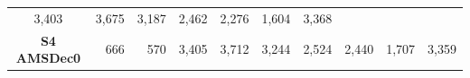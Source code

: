 \documentclass[]{article}
\begin{document}
\begin{longtable}[]{@{}crrrrrrrrr@{}}
\begin{minipage}[t]{0.07\columnwidth}
3,403\strut
\end{minipage} & \begin{minipage}[t]{0.07\columnwidth}\raggedleft\strut
3,675\strut
\end{minipage} & \begin{minipage}[t]{0.07\columnwidth}\raggedleft\strut
3,187\strut
\end{minipage} & \begin{minipage}[t]{0.07\columnwidth}\raggedleft\strut
2,462\strut
\end{minipage} & \begin{minipage}[t]{0.07\columnwidth}\raggedleft\strut
2,276\strut
\end{minipage} & \begin{minipage}[t]{0.07\columnwidth}\raggedleft\strut
1,604\strut
\end{minipage} & \begin{minipage}[t]{0.07\columnwidth}\raggedleft\strut
3,368\strut
\end{minipage}\tabularnewline
\begin{minipage}[t]{0.14\columnwidth}\centering\strut
\textbf{S4 AMSDec0}\strut
\end{minipage} & \begin{minipage}[t]{0.06\columnwidth}\raggedleft\strut
666\strut
\end{minipage} & \begin{minipage}[t]{0.06\columnwidth}\raggedleft\strut
570\strut
\end{minipage} & \begin{minipage}[t]{0.07\columnwidth}\raggedleft\strut
3,405\strut
\end{minipage} & \begin{minipage}[t]{0.07\columnwidth}\raggedleft\strut
3,712\strut
\end{minipage} & \begin{minipage}[t]{0.07\columnwidth}\raggedleft\strut
3,244\strut
\end{minipage} & \begin{minipage}[t]{0.07\columnwidth}\raggedleft\strut
2,524\strut
\end{minipage} & \begin{minipage}[t]{0.07\columnwidth}\raggedleft\strut
2,440\strut
\end{minipage} & \begin{minipage}[t]{0.07\columnwidth}\raggedleft\strut
1,707\strut
\end{minipage} & \begin{minipage}[t]{0.07\columnwidth}\raggedleft\strut
3,359\strut
\end{minipage}\tabularnewline
\bottomrule
\end{longtable}
\end{document}

